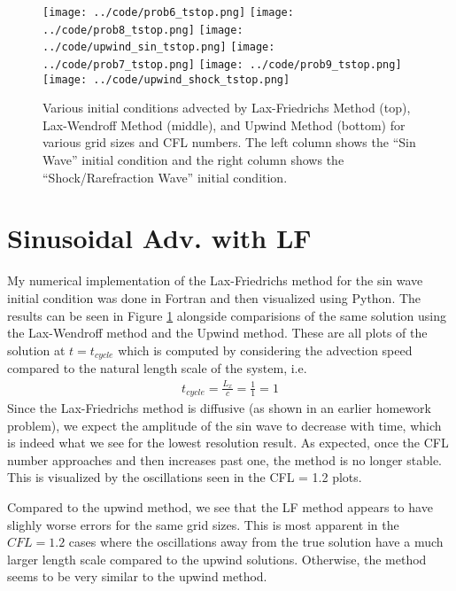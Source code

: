 \documentclass{article}
\begin{document}
\begin{figure}[t]
    \centering
        \centering
        \texttt{[image: ../code/prob6\_tstop.png]}
        \texttt{[image: ../code/prob8\_tstop.png]}
        \texttt{[image: ../code/upwind\_sin\_tstop.png]}
    \emp
        \centering
        \texttt{[image: ../code/prob7\_tstop.png]}
        \texttt{[image: ../code/prob9\_tstop.png]}
        \texttt{[image: ../code/upwind\_shock\_tstop.png]}
    \emp
    \caption{Various initial conditions advected by Lax-Friedrichs Method (top),
    Lax-Wendroff Method (middle), and Upwind Method (bottom) for various grid sizes and
    CFL numbers. The left column shows the ``Sin Wave'' initial condition and
    the right column shows the ``Shock/Rarefraction Wave'' initial condition.}
    \label{fig:solutions}
\end{figure}

\section{Sinusoidal Adv. with LF}
My numerical implementation of the Lax-Friedrichs method for the sin wave initial
condition was done in Fortran and then
visualized using Python. The results can be seen in Figure \ref{fig:solutions}
alongside comparisions of the same solution using the Lax-Wendroff method and
the Upwind method. These are all plots of the solution at $t = t_{cycle}$ which
is computed by considering the advection speed compared to the natural
length scale of the system, i.e.
\begin{gather*}
    t_{cycle} = \frac{L_x}{c} = \frac{1}{1} = 1
\end{gather*}
Since the Lax-Friedrichs method is diffusive (as shown in an
earlier homework problem), we expect the amplitude of the sin wave to decrease
with time, which is indeed what we see for the lowest resolution result. As
expected, once the CFL number approaches and then increases past one, the
method is no longer stable. This is visualized by the oscillations seen in the
CFL = 1.2 plots. 

Compared to the upwind method, we see that the LF method appears to have slighly
worse errors for the same grid sizes. This is most apparent in the $CFL = 1.2$
cases where the oscillations away from the true solution have a much larger
length scale compared to the upwind solutions. Otherwise, the method seems to be
very similar to the upwind method. 
\end{document}

